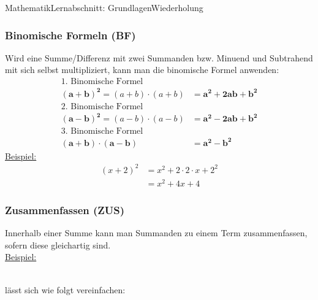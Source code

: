 \documentclass[11pt,twocolumn,oneside,openany,headings=optiontotoc,11pt,numbers=noenddot]{article}
\begin{document}
\begin{worksheet}{Mathematik}{Lernabschnitt: Grundlagen}{Wiederholung}
		\subsubsection*{Binomische Formeln (BF)}
		Wird eine Summe/Differenz mit zwei Summanden bzw. Minuend und Subtrahend mit sich selbst multipliziert, kann man die binomische Formel anwenden:\\
		\begin{align*}
			\text{1. Binomische Formel}\\
			\mathbf{(a+b)^2} = (a + b)\cdot{}(a + b) & = \mathbf{a^2 + 2ab + b^2}\\
			\text{2. Binomische Formel}\\
			\mathbf{(a-b)^2} = (a - b)\cdot{}(a - b) & = \mathbf{a^2 - 2ab + b^2}\\
			\text{3. Binomische Formel}\\
			\mathbf{(a + b)\cdot{}(a - b)} & = \mathbf{a^2 - b^2}
		\end{align*}
		\underline{Beispiel:}
		\begin{align*}
			(x + 2)^2 & = x^2 + 2\cdot{}2\cdot{}x + 2^2\\
			& = x^2 + 4x + 4
		\end{align*}
		\subsubsection*{Zusammenfassen (ZUS)}
		Innerhalb einer Summe kann man Summanden zu einem Term zusammenfassen, sofern diese \glqq{}gleichartig\grqq{} sind.\\
		\underline{Beispiel:}\\
		     \\
		\par\noindent
		lässt sich wie folgt vereinfachen:\\
		  

\end{worksheet}
\end{document}
